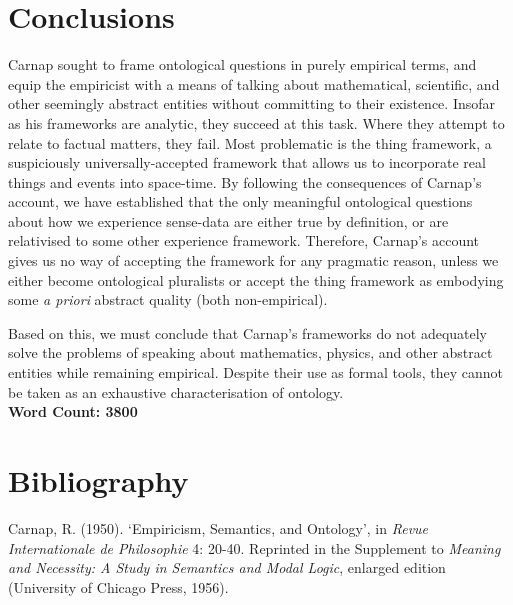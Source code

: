 \documentclass[12pt]{article}
\begin{document}
\section{Conclusions}

Carnap sought to frame ontological questions in purely empirical terms, and equip the empiricist with a means of talking about mathematical, scientific, and other seemingly abstract entities without committing to their existence. Insofar as his frameworks are analytic, they succeed at this task. Where they attempt to relate to factual matters, they fail. Most problematic is the thing framework, a suspiciously universally-accepted framework that allows us to incorporate real things and events into space-time. By following the consequences of Carnap's account, we have established that the only meaningful ontological questions about how we experience sense-data are either true by definition, or are relativised to some other experience framework. Therefore, Carnap's account gives us no way of accepting the framework for any pragmatic reason, unless we either become ontological pluralists or accept the thing framework as embodying some \textit{a priori} abstract quality (both non-empirical). 

Based on this, we must conclude that Carnap's frameworks do not adequately solve the problems of speaking about mathematics, physics, and other abstract entities while remaining empirical. Despite their use as formal tools, they cannot be taken as an exhaustive characterisation of ontology.\\

\noindent
\textbf{Word Count: 3800}


\section*{Bibliography}

\noindent
Carnap, R. (1950). `Empiricism, Semantics, and Ontology', in \textit{Revue Internationale de Philosophie} 4: 20-40. Reprinted in the Supplement to \textit{Meaning and Necessity: A Study in Semantics and Modal Logic}, enlarged edition (University of Chicago Press, 1956).
\end{document}
